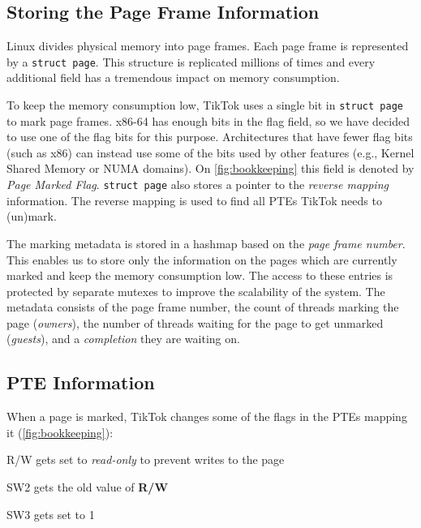 \documentclass[conference]{IEEEtran}
\newcommand{\sysname}{TikTok}
\begin{document}
\subsection{Storing the Page Frame Information}
\label{subsec:frameinfo}
Linux divides physical memory into page frames. Each page frame is represented
by a \texttt{struct page}. This structure is replicated millions of times and
every additional field has a tremendous impact on memory consumption.

To keep the memory consumption low, \sysname{} uses a single bit in \texttt{struct
page} to mark page frames. x86-64 has enough bits in the flag
field, so we have decided to use one of the flag bits for this purpose.
Architectures that have fewer flag bits (such as x86) can instead use some of
the bits used by other features (e.g., Kernel Shared Memory or NUMA domains). On
\autoref{fig:bookkeeping} this field is denoted by \emph{Page Marked Flag}.
\texttt{struct page} also stores a pointer to the \emph{reverse mapping}
information. The reverse mapping is used to find all PTEs \sysname{} needs to
(un)mark.

The marking metadata is stored in a hashmap based on the \emph{page frame
number}. This enables us to store only the information on the pages which are
currently marked and keep the memory consumption low. The access to these entries
is protected by separate mutexes to improve the scalability of the system. The
metadata consists of the page frame number, the count of threads marking the page
(\emph{owners}), the number of threads waiting for the page to get unmarked
(\emph{guests}), and a \emph{completion} they are waiting on. 

\subsection{PTE Information}
\label{subsec:pageinfo}

When a page is marked, \sysname{} changes some of the flags in the PTEs mapping it
(\autoref{fig:bookkeeping}):

\begin{LaTeXdescription}
  \item[R/W] gets set to \emph{read-only} to prevent writes to the page
  \item[SW2] gets the old value of \textbf{R/W}
  \item[SW3] gets set to 1 
\end{LaTeXdescription}
\end{document}
